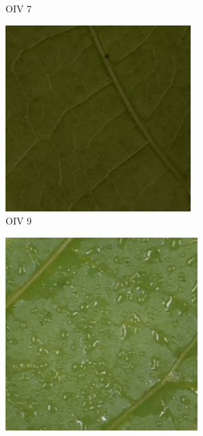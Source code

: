 \documentclass[english]{article}
\begin{document}
\begin{figure}[H]
\begin{subfigure}[b]{0.3\linewidth}
        \caption{OIV 7}\label{fig:issuecrop}
    \end{subfigure}
    \begin{subfigure}[b]{0.3\linewidth}
        \includegraphics[width=\linewidth]{Exp21DM04_inoc2_T6_P02_c_1.png}
        \caption{OIV 9}\label{fig:issuedark}
    \end{subfigure}
    \begin{subfigure}[b]{0.3\linewidth}
        \includegraphics[width=\linewidth]{Exp22DM01_inoc1_T5_P03_a_1.png}

\end{subfigure}
\end{figure}
\end{document}
